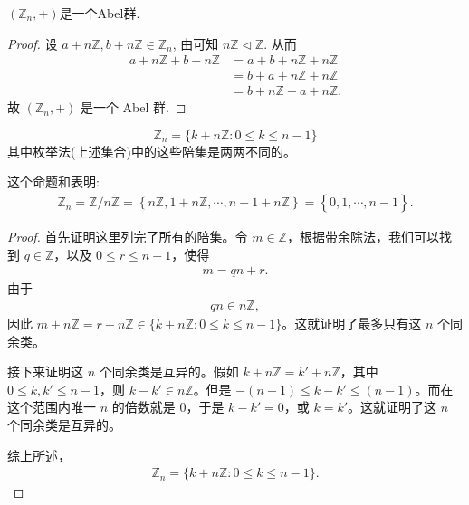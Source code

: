 \documentclass[../../main.tex]{subfiles}
\begin{document}
\begin{proposition}\label{proposition:Z_n是一个Abel群}
$(\mathbb{Z}_n,+)$是一个Abel群.
\end{proposition}
\begin{proof}
设 $a+n\mathbb{Z} ,b+n\mathbb{Z} \in \mathbb{Z} _n$, 由可知 $n\mathbb{Z} \lhd \mathbb{Z}$. 从而
\begin{align*}
a+n\mathbb{Z} +b+n\mathbb{Z} &=a+b+n\mathbb{Z} +n\mathbb{Z} \\
&=b+a+n\mathbb{Z} +n\mathbb{Z} \\
&=b+n\mathbb{Z} +a+n\mathbb{Z} .
\end{align*}
故 $(\mathbb{Z} _n,+)$ 是一个 Abel 群.

\end{proof}


\begin{proposition}\label{proposition:枚举Z_n的所有元素}
\[
\mathbb{Z}_n = \{k + n\mathbb{Z} : 0\leqslant k\leqslant n - 1\}
\]
其中枚举法(上述集合)中的这些陪集是两两不同的。
\end{proposition}
\begin{note}
这个命题和表明:
\begin{align*}
\mathbb{Z} _n=\mathbb{Z} /n\mathbb{Z} =\left\{ n\mathbb{Z} ,1+n\mathbb{Z} ,\cdots ,n-1+n\mathbb{Z} \right\} =\left\{ \overline{0},\overline{1},\cdots ,\overline{n-1} \right\} .
\end{align*}
\end{note}
\begin{proof}
首先证明这里列完了所有的陪集。令 $m\in\mathbb{Z}$，根据带余除法，我们可以找到 $q\in\mathbb{Z}$，以及 $0\leqslant r\leqslant n - 1$，使得
\begin{align*}
m = qn + r .
\end{align*}
由于
\begin{align*}
qn\in n\mathbb{Z},
\end{align*}
因此 $m + n\mathbb{Z}=r + n\mathbb{Z}\in\{k + n\mathbb{Z} : 0\leqslant k\leqslant n - 1\}$。这就证明了最多只有这 $n$ 个同余类。

接下来证明这 $n$ 个同余类是互异的。假如 $k + n\mathbb{Z}=k' + n\mathbb{Z}$，其中 $0\leqslant k,k'\leqslant n - 1$，则 $k - k'\in n\mathbb{Z}$。但是 $-(n - 1)\leqslant k - k'\leqslant (n - 1)$。而在这个范围内唯一 $n$ 的倍数就是 $0$，于是 $k - k' = 0$，或 $k = k'$。这就证明了这 $n$ 个同余类是互异的。

综上所述，
\begin{align*}
\mathbb{Z}_n = \{k + n\mathbb{Z} : 0\leqslant k\leqslant n - 1\}.
\end{align*} 

\end{proof}
\end{document}
